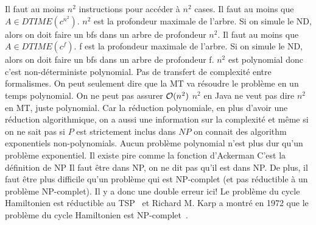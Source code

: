 \begin{mcqs}
  {Il faut au moins $n^2$ instructions pour accéder à $n^2$ cases.}
  {Il faut au moins que $A \in DTIME(c^{n^2})$. $n^2$ est la profondeur maximale de l'arbre. Si on simule le ND, alors on doit faire un bfs dans un arbre de profondeur $n^2$.}
  {Il faut au moins que $A \in DTIME(c^f)$. f est la profondeur maximale de l'arbre. Si on simule le ND, alors on doit faire un bfs dans un arbre de profondeur f.}
  {$n^2$ est polynomial donc c'est non-déterministe polynomial.}
  {Pas de transfert de complexité entre formalismes. On peut seulement dire que la MT va résoudre le problème en un temps polynomial. On ne peut pas assurer $\mathcal{O}(n^{2})$}
  {$n^2$ en Java ne veut pas dire $n^2$ en MT, juste polynomial.}
  {Car la réduction polynomiale, en plus d’avoir une réduction algorithmique, on a aussi une information sur la complexité
  et même si on ne sait pas si $P$ est strictement inclus dans $NP$ on connait des algorithm exponentiels non-polynomials.}
  {Aucun problème polynomial n'est plus dur qu'un problème exponentiel.}
  {Il existe pire comme la fonction d'Ackerman}
  {C'est la définition de NP}
  {Il faut être dans NP, on ne dit pas qu'il est dans NP. De plus, il faut être plus difficile qu'un problème qui est NP-complet (et pas réductible à un problème NP-complet). Il y a donc une double erreur ici!}
  {Le problème du cycle Hamiltonien est réductible au TSP~\cite[Theorem~34.14]{cormen2009algorithm} et Richard M. Karp a montré en 1972 que le problème du cycle Hamiltonien est NP-complet~\cite[Theorem~34.13]{cormen2009algorithm}.}
\end{mcqs}
